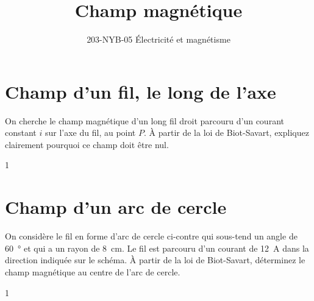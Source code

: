 \documentclass{tufte-handout}
\title{Champ magnétique}
\date{}
\author{203-NYB-05 Électricité et magnétisme}
\def\reponse{0}
\begin{document}
\maketitle


\section{Champ d'un fil, le long de l'axe}

On cherche le champ magnétique d'un long fil droit parcouru d'un courant
constant $i$ sur l'axe du fil, au point $P$. À partir de la loi de Biot-Savart,
expliquez clairement pourquoi ce champ doit être nul.

\begin{marginfigure}
  \begin{center}
  \end{center}
\end{marginfigure}

\if\reponse1
  {\color{tblue}
  }
\else
  \vspace{5cm}
\fi


\section{Champ d'un arc de cercle}

On considère le fil en forme d'arc de cercle ci-contre qui sous-tend un angle
de \SI{60}{\degree} et qui a un rayon de \SI{8}{\centi\meter}. Le fil est
parcouru d'un courant de \SI{12}{\ampere} dans la direction indiquée sur le
schéma. À partir de la loi de Biot-Savart, déterminez le champ magnétique au
centre de l'arc de cercle.

\begin{marginfigure}
  \begin{center}
  \end{center}
\end{marginfigure}

\if\reponse1
  {\color{tblue}
  }
\else
  \vspace{4cm}
\fi
\end{document}
